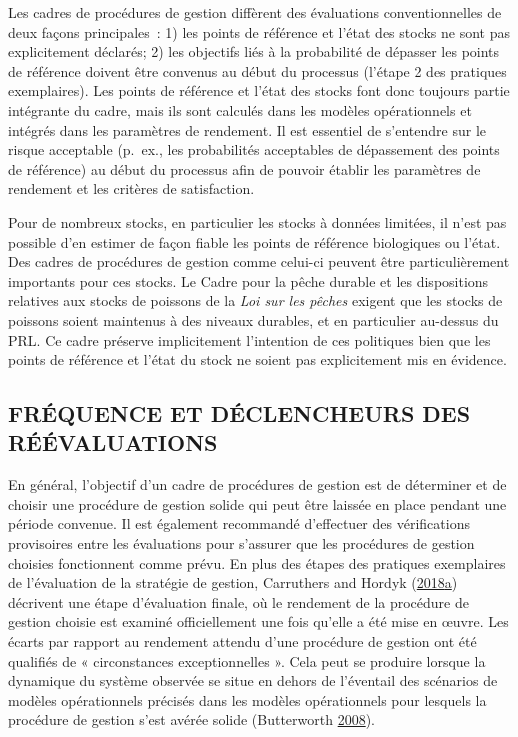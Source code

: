 \documentclass[11pt]{book}
\begin{document}
Les cadres de procédures de gestion diffèrent des évaluations conventionnelles de deux façons principales~: 1) les points de référence et l'état des stocks ne sont pas explicitement déclarés; 2) les objectifs liés à la probabilité de dépasser les points de référence doivent être convenus au début du processus (l'étape 2 des pratiques exemplaires). Les points de référence et l'état des stocks font donc toujours partie intégrante du cadre, mais ils sont calculés dans les modèles opérationnels et intégrés dans les paramètres de rendement. Il est essentiel de s'entendre sur le risque acceptable (p.~ex., les probabilités acceptables de dépassement des points de référence) au début du processus afin de pouvoir établir les paramètres de rendement et les critères de satisfaction.

Pour de nombreux stocks, en particulier les stocks à données limitées, il n'est pas possible d'en estimer de façon fiable les points de référence biologiques ou l'état. Des cadres de procédures de gestion comme celui-ci peuvent être particulièrement importants pour ces stocks. Le Cadre pour la pêche durable et les dispositions relatives aux stocks de poissons de la \emph{Loi sur les pêches} exigent que les stocks de poissons soient maintenus à des niveaux durables, et en particulier au-dessus du PRL. Ce cadre préserve implicitement l'intention de ces politiques bien que les points de référence et l'état du stock ne soient pas explicitement mis en évidence.

\hypertarget{sec:discussion-triggers}{%
\subsection{FRÉQUENCE ET DÉCLENCHEURS DES RÉÉVALUATIONS}\label{sec:discussion-triggers}}

En général, l'objectif d'un cadre de procédures de gestion est de déterminer et de choisir une procédure de gestion solide qui peut être laissée en place pendant une période convenue. Il est également recommandé d'effectuer des vérifications provisoires entre les évaluations pour s'assurer que les procédures de gestion choisies fonctionnent comme prévu. En plus des étapes des pratiques exemplaires de l'évaluation de la stratégie de gestion, Carruthers and Hordyk (\protect\hyperlink{ref-carruthers2018}{2018}\protect\hyperlink{ref-carruthers2018}{a}) décrivent une étape d'évaluation finale, où le rendement de la procédure de gestion choisie est examiné officiellement une fois qu'elle a été mise en œuvre. Les écarts par rapport au rendement attendu d'une procédure de gestion ont été qualifiés de « circonstances exceptionnelles ». Cela peut se produire lorsque la dynamique du système observée se situe en dehors de l'éventail des scénarios de modèles opérationnels précisés dans les modèles opérationnels pour lesquels la procédure de gestion s'est avérée solide (Butterworth \protect\hyperlink{ref-butterworth2008}{2008}).
\end{document}
